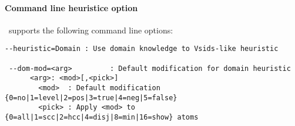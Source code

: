  \paragraph{Command line heuristice option}
 \clasp\ supports the following command line options:
\scriptsize\begin{lstlisting}[numbers=none]
 --heuristic=Domain : Use domain knowledge to Vsids-like heuristic

 --dom-mod=<arg>         : Default modification for domain heuristic
      <arg>: <mod>[,<pick>]
        <mod>  : Default modification {0=no|1=level|2=pos|3=true|4=neg|5=false}
        <pick> : Apply <mod> to {0=all|1=scc|2=hcc|4=disj|8=min|16=show} atoms
\end{lstlisting}


\iffalse

\fi
